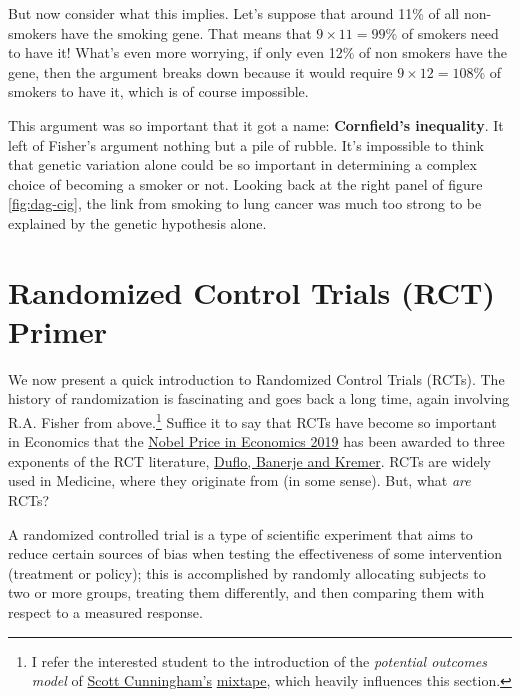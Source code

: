 \documentclass[]{book}
\let\rmarkdownfootnote\footnote%
\def\footnote{\protect\rmarkdownfootnote}
\newenvironment{note}{\begin{tcolorbox}[colback=blue!5!white,colframe=blue!75!black]}{\end{tcolorbox}}
\begin{document}
But now consider what this implies. Let's suppose that around 11\% of
all non-smokers have the smoking gene. That means that
\(9\times 11 = 99\%\) of smokers need to have it! What's even more
worrying, if only even 12\% of non smokers have the gene, then the
argument breaks down because it would require \(9\times 12 = 108\%\) of
smokers to have it, which is of course impossible.

This argument was so important that it got a name: \textbf{Cornfield's
inequality}. It left of Fisher's argument nothing but a pile of rubble.
It's impossible to think that genetic variation alone could be so
important in determining a complex choice of becoming a smoker or not.
Looking back at the right panel of figure \ref{fig:dag-cig}, the link
from smoking to lung cancer was much too strong to be explained by the
genetic hypothesis alone.

\section{Randomized Control Trials (RCT) Primer}\label{rct}

We now present a quick introduction to Randomized Control Trials (RCTs).
The history of randomization is fascinating and goes back a long time,
again involving R.A. Fisher from above.\footnote{I refer the interested
  student to the introduction of the \emph{potential outcomes model} of
  \href{https://twitter.com/causalinf}{Scott Cunningham's}
  \href{http://scunning.com/cunningham_mixtape.pdf}{mixtape}, which
  heavily influences this section.} Suffice it to say that RCTs have
become so important in Economics that the
\href{https://www.nobelprize.org/prizes/economic-sciences/2019/summary/}{Nobel
Price in Economics 2019} has been awarded to three exponents of the RCT
literature,
\href{https://www.economist.com/finance-and-economics/2019/10/17/a-nobel-economics-prize-goes-to-pioneers-in-understanding-poverty}{Duflo,
Banerje and Kremer}. RCTs are widely used in Medicine, where they
originate from (in some sense). But, what \emph{are} RCTs?

\begin{note}
A randomized controlled trial is a type of scientific experiment that
aims to reduce certain sources of bias when testing the effectiveness of
some intervention (treatment or policy); this is accomplished by
randomly allocating subjects to two or more groups, treating them
differently, and then comparing them with respect to a measured
response.
\end{note}
\end{document}
